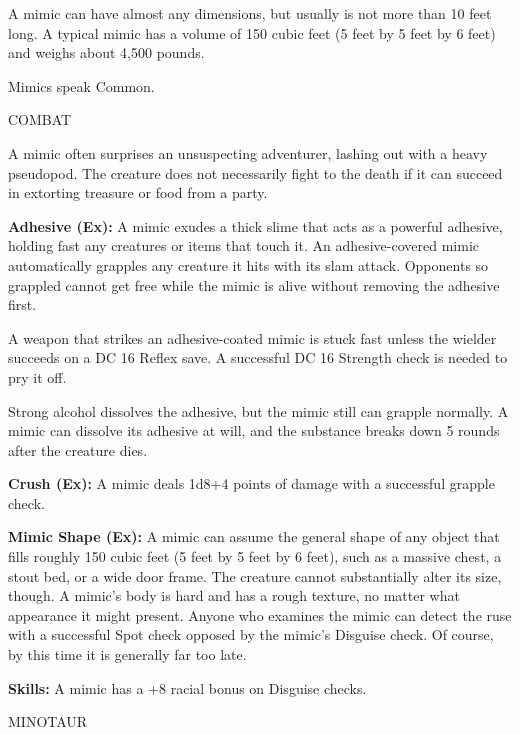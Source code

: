 \documentclass{article}
\begin{document}
A mimic can have almost any dimensions, but usually is not more than 10 feet long. 
A typical mimic has a volume of 150 cubic feet (5 feet by 5 feet by 6 feet) and 
weighs about 4,500 pounds. 

Mimics speak Common.

COMBAT

A mimic often surprises an unsuspecting adventurer, lashing out with a heavy pseudopod. 
The creature does not necessarily fight to the death if it can succeed in extorting 
treasure or food from a party.

\textbf{Adhesive (Ex): }A mimic exudes a thick slime that acts as a powerful adhesive, 
holding fast any creatures or items that touch it. An adhesive-covered mimic automatically 
grapples any creature it hits with its slam attack. Opponents so grappled cannot 
get free while the mimic is alive without removing the adhesive first.

A weapon that strikes an adhesive-coated mimic is stuck fast unless the wielder 
succeeds on a DC 16 Reflex save. A successful DC 16 Strength check is needed to 
pry it off.

Strong alcohol dissolves the adhesive, but the mimic still can grapple normally. 
A mimic can dissolve its adhesive at will, and the substance breaks down 5 rounds 
after the creature dies.

\textbf{Crush (Ex): }A mimic deals 1d8+4 points of damage with a successful grapple 
check.

\textbf{Mimic Shape (Ex): }A mimic can assume the general shape of any object that 
fills roughly 150 cubic feet (5 feet by 5 feet by 6 feet), such as a massive chest, 
a stout bed, or a wide door frame. The creature cannot substantially alter its 
size, though. A mimic's body is hard and has a rough texture, no matter what appearance 
it might present. Anyone who examines the mimic can detect the ruse with a successful 
Spot check opposed by the mimic's Disguise check. Of course, by this time it is 
generally far too late.

\textbf{Skills: }A mimic has a +8 racial bonus on Disguise checks.

\vspace{12pt}
{\LARGE{}MINOTAUR}
\end{document}

